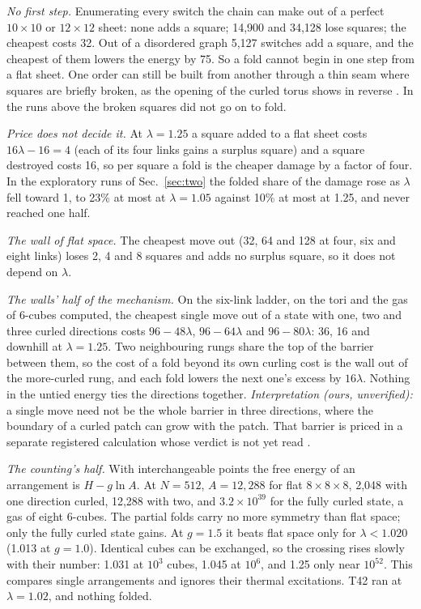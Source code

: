 \documentclass[aps,pre,10pt,twocolumn,superscriptaddress,nofootinbib]{revtex4-2}
\begin{document}
\emph{No first step.} Enumerating every switch the chain can make out of a perfect $10 \times 10$ or
$12 \times 12$ sheet: none adds a square; 14,900 and 34,128 lose squares; the cheapest costs 32. Out of a
disordered graph 5,127 switches add a square, and the cheapest of them lowers the energy by 75. So a fold cannot begin in
one step from a flat sheet. One order can still be built from another through a thin seam where squares are briefly
broken, as the opening of the curled torus shows in reverse \cite{paper1}. In the runs above the broken squares did
not go on to fold.

\emph{Price does not decide it.} At $\lambda = 1.25$ a square added to a flat sheet costs $16\lambda - 16 = 4$
(each of its four links gains a surplus square) and a square destroyed costs 16, so per square a fold is the cheaper damage by a factor of four. In the exploratory runs of
Sec.~\ref{sec:two} the folded share of the damage rose as $\lambda$ fell toward 1, to 23\% at most at $\lambda =
1.05$ against 10\% at most at 1.25, and never reached one half.

\emph{The wall of flat space.} The cheapest move out (32, 64 and 128 at four, six and eight links) loses 2, 4 and 8
squares and adds no surplus square, so it does not depend on $\lambda$.

\emph{The walls' half of the mechanism.} On the six-link ladder, on the tori and the gas of 6-cubes computed, the
cheapest single move out of a state with one, two and three curled directions costs $96 - 48\lambda$,
$96 - 64\lambda$ and $96 - 80\lambda$: 36, 16 and downhill at $\lambda = 1.25$. Two neighbouring rungs share the top
of the barrier between them, so the cost of a fold beyond its own curling cost is the wall out of the more-curled
rung, and each fold lowers the next one's excess by $16\lambda$. Nothing in the untied energy ties
the directions together. \emph{Interpretation (ours, unverified):} a single move need not be the whole barrier in
three directions, where the boundary of a curled patch can grow with the patch. That barrier is priced in a separate
registered calculation whose verdict is not yet read \cite{paper5,repo}.

\emph{The counting's half.} With interchangeable points the free energy of an arrangement is $H - g \ln A$. At
$N = 512$, $A = 12{,}288$ for flat $8 \times 8 \times 8$, 2,048 with one direction curled, 12,288 with two, and
$3.2 \times 10^{39}$ for the fully curled state, a gas of eight 6-cubes. The partial folds carry no more symmetry
than flat space; only the fully curled state gains. At $g = 1.5$ it beats flat space only for $\lambda < 1.020$
(1.013 at $g = 1.0$). Identical cubes can be exchanged, so the crossing rises slowly with their number: 1.031 at
$10^3$ cubes, 1.045 at $10^6$, and 1.25 only near $10^{52}$. This compares single arrangements and ignores their
thermal excitations. T42 ran at $\lambda = 1.02$, and nothing folded.
\end{document}
